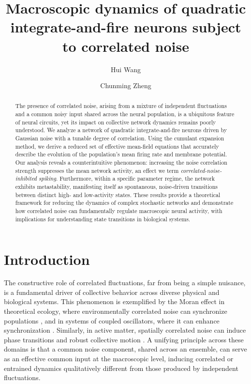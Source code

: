 \documentclass[aps,twocolumn,pre]{revtex4-2}
\begin{document}
\title{Macroscopic dynamics of quadratic integrate-and-fire neurons subject to correlated noise}
\author{Hui Wang}
\author{Chunming Zheng}

\begin{abstract}
The presence of correlated noise, arising from a mixture of independent fluctuations and a common noisy input shared across the neural population, is a ubiquitous feature of neural circuits, yet its impact on collective network dynamics remains poorly understood. We analyze a network of quadratic integrate-and-fire neurons driven by Gaussian noise with a tunable degree of correlation. Using the cumulant expansion method, we derive a reduced set of effective mean-field equations that accurately describe the evolution of the population's mean firing rate and membrane potential. Our analysis reveals a counterintuitive phenomenon: increasing the noise correlation strength suppresses the mean network activity, an effect we term \textit{correlated-noise-inhibited spiking}. Furthermore, within a specific parameter regime, the network exhibits metastability, manifesting itself as spontaneous, noise-driven transitions between distinct high- and low-activity states. These results provide a theoretical framework for reducing the dynamics of complex stochastic networks and demonstrate how correlated noise can fundamentally regulate macroscopic neural activity, with implications for understanding state transitions in biological systems.
\end{abstract}

\maketitle

\section{Introduction}
The constructive role of correlated fluctuations, far from being a simple nuisance, is a fundamental driver of collective behavior across diverse physical and biological systems. This phenomenon is exemplified by the Moran effect in theoretical ecology, where environmentally correlated noise can synchronize populations \cite{moran1953statistical,grenfell1998noise}, and in systems of coupled oscillators, where it can enhance  synchronization \cite{pikovsky1984Synchronization,zhou2002noise, teramae2004robustness, goldobin2005synchronization,nakao2007noise,gong2019repulsively}. Similarly, in active matter, spatially correlated noise can induce phase transitions and robust collective motion \cite{zheng2022noise}. A unifying principle across these domains is that a common noise component, shared across an ensemble, can serve as an effective common input at the macroscopic level, inducing correlated or entrained dynamics qualitatively different from those produced by independent fluctuations.
\end{document}
